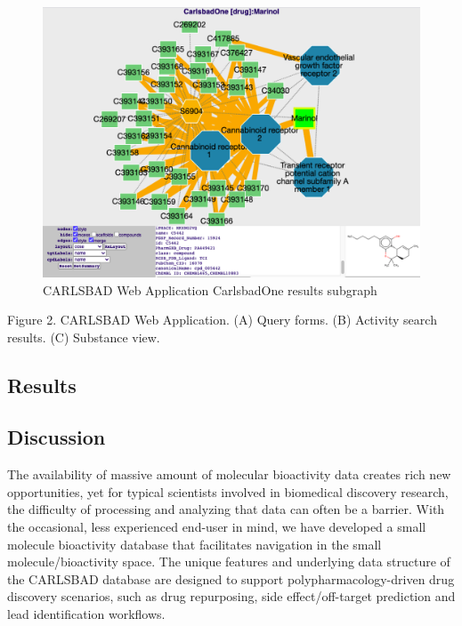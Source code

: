 \begin{figure}
    \centering
    \includegraphics[width=\textwidth]{figures/carlsbad/CARLSBAD_CBOne_Marinol_02.png}
    \caption{CARLSBAD Web Application CarlsbadOne results subgraph}
    \label{fig:cb_cbone_02}
\end{figure}

Figure 2.
CARLSBAD Web Application. (A) Query forms. (B) Activity search results. (C) Substance view.

\subsection{Results}

\subsection{Discussion}

The availability of massive amount of molecular bioactivity data creates rich new opportunities, yet for typical scientists involved in biomedical discovery research, the difficulty of processing and analyzing that data can often be a barrier. With the occasional, less experienced end-user in mind, we have developed a small molecule bioactivity database that facilitates navigation in the small molecule/bioactivity space. The unique features and underlying data structure of the CARLSBAD database are designed to support polypharmacology-driven drug discovery scenarios, such as drug repurposing, side effect/off-target prediction and lead identification workflows.

